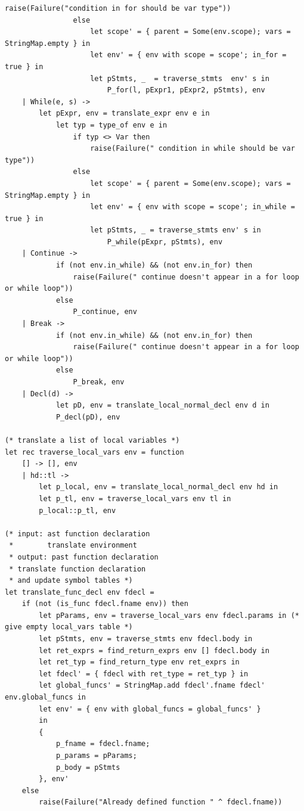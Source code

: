 \documentclass[12pt]{article} %
\begin{document}
\begin{lstlisting}[style=appendix, caption=translate.ml]
                    raise(Failure("condition in for should be var type"))
                else
                    let scope' = { parent = Some(env.scope); vars = StringMap.empty } in
                    let env' = { env with scope = scope'; in_for = true } in
                    let pStmts, _  = traverse_stmts  env' s in
                        P_for(l, pExpr1, pExpr2, pStmts), env 
    | While(e, s) -> 
        let pExpr, env = translate_expr env e in
            let typ = type_of env e in
                if typ <> Var then
                    raise(Failure(" condition in while should be var type"))
                else
                    let scope' = { parent = Some(env.scope); vars = StringMap.empty } in
                    let env' = { env with scope = scope'; in_while = true } in
                    let pStmts, _ = traverse_stmts env' s in
                        P_while(pExpr, pStmts), env 
    | Continue -> 
            if (not env.in_while) && (not env.in_for) then
                raise(Failure(" continue doesn't appear in a for loop or while loop"))
            else
                P_continue, env
    | Break -> 
            if (not env.in_while) && (not env.in_for) then
                raise(Failure(" continue doesn't appear in a for loop or while loop"))
            else
                P_break, env
    | Decl(d) -> 
            let pD, env = translate_local_normal_decl env d in 
            P_decl(pD), env

(* translate a list of local variables *)
let rec traverse_local_vars env = function
    [] -> [], env
    | hd::tl ->
        let p_local, env = translate_local_normal_decl env hd in
        let p_tl, env = traverse_local_vars env tl in
        p_local::p_tl, env

(* input: ast function declaration 
 *        translate environment
 * output: past function declaration
 * translate function declaration 
 * and update symbol tables *)
let translate_func_decl env fdecl =
    if (not (is_func fdecl.fname env)) then
        let pParams, env = traverse_local_vars env fdecl.params in (* give empty local_vars table *)
        let pStmts, env = traverse_stmts env fdecl.body in
        let ret_exprs = find_return_exprs env [] fdecl.body in
        let ret_typ = find_return_type env ret_exprs in
        let fdecl' = { fdecl with ret_type = ret_typ } in
        let global_funcs' = StringMap.add fdecl'.fname fdecl' env.global_funcs in
        let env' = { env with global_funcs = global_funcs' }    
        in
        {
            p_fname = fdecl.fname;
            p_params = pParams; 
            p_body = pStmts 
        }, env'
    else
        raise(Failure("Already defined function " ^ fdecl.fname))


\end{lstlisting}
\end{document}
